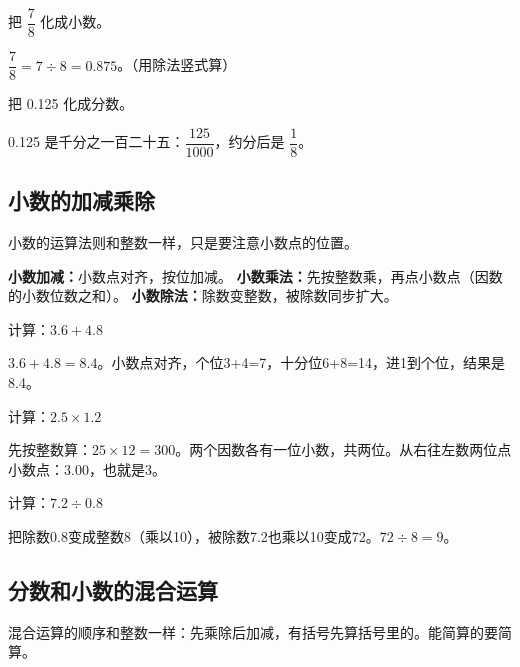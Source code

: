\begin{example}
把 $\dfrac{7}{8}$ 化成小数。
\end{example}
\begin{solution}
$\dfrac{7}{8} = 7\div8 = 0.875$。（用除法竖式算）
\end{solution}

\begin{example}
把 0.125 化成分数。
\end{example}
\begin{solution}
0.125 是千分之一百二十五：$\dfrac{125}{1000}$，约分后是 $\dfrac{1}{8}$。
\end{solution}

\subsection*{小数的加减乘除}

小数的运算法则和整数一样，只是要注意小数点的位置。

\textbf{小数加减：}小数点对齐，按位加减。
\textbf{小数乘法：}先按整数乘，再点小数点（因数的小数位数之和）。
\textbf{小数除法：}除数变整数，被除数同步扩大。

\begin{example}
计算：$3.6+4.8$
\end{example}
\begin{solution}
$3.6+4.8 = 8.4$。小数点对齐，个位3+4=7，十分位6+8=14，进1到个位，结果是8.4。
\end{solution}

\begin{example}
计算：$2.5\times1.2$
\end{example}
\begin{solution}
先按整数算：$25\times12=300$。两个因数各有一位小数，共两位。从右往左数两位点小数点：3.00，也就是3。
\end{solution}

\begin{example}
计算：$7.2\div0.8$
\end{example}
\begin{solution}
把除数0.8变成整数8（乘以10），被除数7.2也乘以10变成72。$72\div8=9$。
\end{solution}

\subsection*{分数和小数的混合运算}

混合运算的顺序和整数一样：先乘除后加减，有括号先算括号里的。能简算的要简算。

